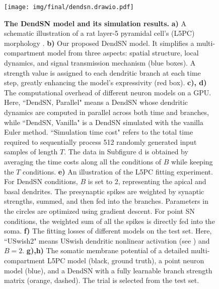 \begin{figure}[tp!]
    \centering
    \texttt{[image: img/final/dendsn.drawio.pdf]}
    \caption{
        \textbf{The DendSN model and its simulation results.}
        \textbf{a)} A schematic illustration of a rat layer-5 pyramidal cell's (L5PC) morphology \cite{beniaguev2021cortical}. 
        \textbf{b)} Our proposed DendSN model. It simplifies a multi-compartment model from three aspects: spatial structure, local dynamics, and signal transmission mechanism (blue boxes). A strength value is assigned to each dendritic branch at each time step, greatly enhancing the model's expressivity (red box).
        \textbf{c), d)} The computational overhead of different neuron models on a GPU. Here, ``DendSN, Parallel" means a DendSN whose dendritic dynamics are computed in parallel across both time and branches, while ``DendSN, Vanilla" is a DendSN simulated with the vanilla Euler method. ``Simulation time cost" refers to the total time required to sequentially process 512 randomly generated input samples of length $T$. The data in Subfigure d is obtained by averaging the time costs along all the conditions of $B$ while keeping the $T$ conditions.
        \textbf{e)} An illustration of the L5PC fitting experiment. For DendSN conditions, $B$ is set to $2$, representing the apical and basal dendrites. The presynaptic spikes are weighted by synaptic strengths, summed, and then fed into the branches. Parameters in the circles are optimized using gradient descent. For point SN conditions, the weighted sum of all the spikes is directly fed into the soma.
        \textbf{f)} The fitting losses of different models on the test set. Here, ``USwish2" means USwish dendritic nonlinear activation (see ) and $B=2$.
        \textbf{g),h)} The somatic membrane potential of a detailed multi-compartment L5PC model (black, ground truth), a point neuron model (blue), and a DendSN with a fully learnable branch strength matrix (orange, dashed). The trial is selected from the test set.
    }
    \label{fig:dendsn}
\end{figure}

